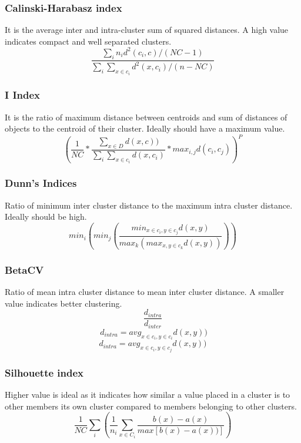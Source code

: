 \documentclass{svproc}
\begin{document}
\subsubsection{Calinski-Harabasz index \cite{ppr:1} \cite{ppr:11}}
It is the average inter and intra-cluster sum of squared distances. A high value indicates compact and well separated clusters.
\begin{equation}
\frac{\sum_i n_i d^2 (c_i, c) / (NC - 1)}{\sum_i \sum_{x \in c_i} d^2 (x,c_i) / (n - NC)}
\end{equation}
\subsubsection{I Index \cite{ppr:1} \cite{ppr:11}}
It is the ratio of maximum
distance between centroids and sum of distances of objects to the 
centroid of their cluster. Ideally should have a maximum value. 
\begin{equation}
(\frac{1}{NC} * \frac{\sum_{x \in D} d(x,c))}{\sum_i \sum_{x \in c_i} d(x,c_i)} * max_{i,j} d(c_i, c_j))^P
\end{equation}
\subsubsection{Dunn's Indices \cite{ppr:1} \cite{ppr:11}}
Ratio of minimum inter cluster distance to the maximum intra cluster distance. Ideally should be high. 
\begin{equation}
min_i(min_j (\frac{min_{x \in c_i, y \in c_j} d(x,y)}{max_k(max_{ x , y \in c_k} d(x,y))}))
\end{equation}
\subsubsection{BetaCV \cite{ppr:1} \cite{ppr:11}}
Ratio of mean intra cluster distance to mean inter cluster distance. A smaller value indicates better clustering.
\begin{equation}
\frac{d_{intra}}{d_{inter}}
\end{equation}
\begin{equation}\
d_{intra} = avg_{x \in c_i, y \in c_i} d(x,y))
\end{equation}
\begin{equation}
d_{intra} = avg_{x \in c_i, y \in c_j} d(x,y))
\end{equation}

\subsubsection{Silhouette index \cite{ppr:1} \cite{ppr:11}}
Higher value is ideal as it indicates how similar a value placed in a cluster is to other members its own cluster compared to members belonging to other clusters.
\begin{equation}
\frac{1}{NC} \sum_i (\frac{1}{n_i} \sum_{x \in C_i} \frac{b(x) - a(x)}{max[b(x) - a(x))]})
\end{equation}
\end{document}
